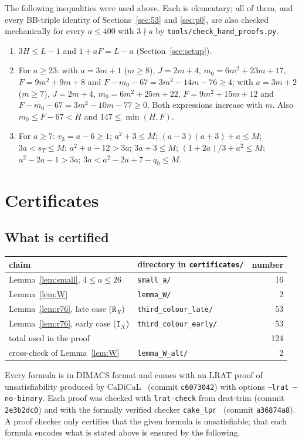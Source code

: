 \documentclass[11pt]{amsart}
\theoremstyle{definition}
\theoremstyle{remark}
\begin{document}
The following inequalities were used above. Each is elementary; all of them, and every BB-triple identity of
Sections~\ref{sec:53} and \ref{sec:p0}, are also checked mechanically for every $a\le400$ with $3\nmid a$ by
\texttt{tools/check\_hand\_proofs.py}.
\begin{enumerate}
\item $3H\le L-1$ and $1+aF=L-a$ (Section~\ref{sec:setup}).
\item For $a\ge23$: with $a=3m+1$ ($m\ge8$), $J=2m+4$, $m_0=6m^2+23m+17$, $F=9m^2+9m+8$ and $F-m_0-67=3m^2-14m-76\ge4$;
with $a=3m+2$ ($m\ge7$), $J=2m+4$, $m_0=6m^2+25m+22$, $F=9m^2+15m+12$ and $F-m_0-67=3m^2-10m-77\ge0$. Both
expressions increase with $m$. Also $m_0\le F-67<H$ and $147\le\min(H,F)$.
\item For $a\ge7$: $v_3=a-6\ge1$; $a^2+3\le M$; $(a-3)(a+3)+a\le M$; $3a<s_T\le M$; $a^2+a-12>3a$; $3a+3\le M$;
$(1+2a)/3+a^2\le M$; $a^2-2a-1>3a$; $3a<a^2-2a+7-q_0\le M$.
\end{enumerate}

\section{Certificates}\label{sec:cert}

\subsection{What is certified}
\begin{center}\begin{tabular}{llr}\toprule
claim & directory in \texttt{certificates/} & number\\\midrule
Lemma~\ref{lem:small}, $4\le a\le26$ & \texttt{small\_a/} & 16\\
Lemma~\ref{lem:W} & \texttt{lemma\_W/} & 2\\
Lemma~\ref{lem:r76}, late case ($\mathtt R_X$) & \texttt{third\_colour\_late/} & 53\\
Lemma~\ref{lem:r76}, early case ($\mathtt I_X$) & \texttt{third\_colour\_early/} & 53\\\midrule
total used in the proof & & 124\\
cross-check of Lemma~\ref{lem:W} & \texttt{lemma\_W\_alt/} & 2\\\bottomrule
\end{tabular}\end{center}

Every formula is in DIMACS format and comes with an LRAT proof of unsatisfiability produced by CaDiCaL~\cite{cadical}
(commit \texttt{c6073042}) with options \texttt{--lrat --no-binary}. Each proof was checked with \texttt{lrat-check}
from drat-trim (commit \texttt{2e3b2dc0}) and with the formally verified checker \texttt{cake\_lpr}~\cite{cakelpr}
(commit \texttt{a36874a8}). A proof checker only certifies that the given formula is unsatisfiable; that each formula
encodes what is stated above is ensured by the following.
\end{document}
